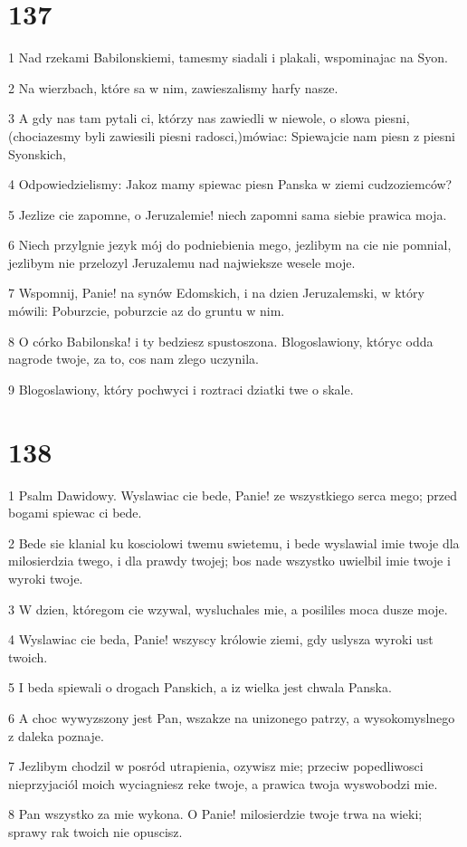 \chapter{137}

\par 1 Nad rzekami Babilonskiemi, tamesmy siadali i plakali, wspominajac na Syon.
\par 2 Na wierzbach, które sa w nim, zawieszalismy harfy nasze.
\par 3 A gdy nas tam pytali ci, którzy nas zawiedli w niewole, o slowa piesni, (chociazesmy byli zawiesili piesni radosci,)mówiac: Spiewajcie nam piesn z piesni Syonskich,
\par 4 Odpowiedzielismy: Jakoz mamy spiewac piesn Panska w ziemi cudzoziemców?
\par 5 Jezlize cie zapomne, o Jeruzalemie! niech zapomni sama siebie prawica moja.
\par 6 Niech przylgnie jezyk mój do podniebienia mego, jezlibym na cie nie pomnial, jezlibym nie przelozyl Jeruzalemu nad najwieksze wesele moje.
\par 7 Wspomnij, Panie! na synów Edomskich, i na dzien Jeruzalemski, w który mówili: Poburzcie, poburzcie az do gruntu w nim.
\par 8 O córko Babilonska! i ty bedziesz spustoszona. Blogoslawiony, któryc odda nagrode twoje, za to, cos nam zlego uczynila.
\par 9 Blogoslawiony, który pochwyci i roztraci dziatki twe o skale.

\chapter{138}

\par 1 Psalm Dawidowy. Wyslawiac cie bede, Panie! ze wszystkiego serca mego; przed bogami spiewac ci bede.
\par 2 Bede sie klanial ku kosciolowi twemu swietemu, i bede wyslawial imie twoje dla milosierdzia twego, i dla prawdy twojej; bos nade wszystko uwielbil imie twoje i wyroki twoje.
\par 3 W dzien, któregom cie wzywal, wysluchales mie, a posililes moca dusze moje.
\par 4 Wyslawiac cie beda, Panie! wszyscy królowie ziemi, gdy uslysza wyroki ust twoich.
\par 5 I beda spiewali o drogach Panskich, a iz wielka jest chwala Panska.
\par 6 A choc wywyzszony jest Pan, wszakze na unizonego patrzy, a wysokomyslnego z daleka poznaje.
\par 7 Jezlibym chodzil w posród utrapienia, ozywisz mie; przeciw popedliwosci nieprzyjaciól moich wyciagniesz reke twoje, a prawica twoja wyswobodzi mie.
\par 8 Pan wszystko za mie wykona. O Panie! milosierdzie twoje trwa na wieki; sprawy rak twoich nie opuscisz.

